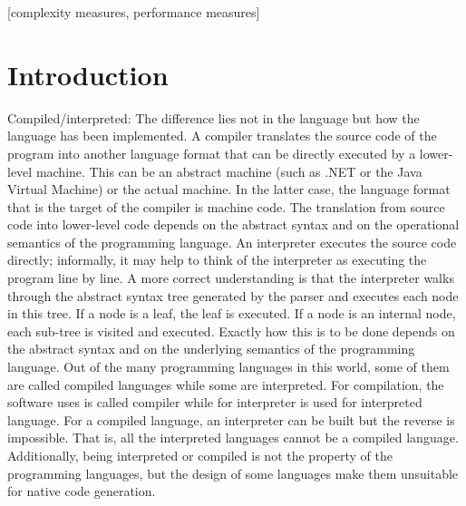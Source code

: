 \documentclass{sig-alternate}
\begin{document}
\maketitle
\begin{abstract}

\end{abstract}

[complexity measures, performance measures]



\section{Introduction}
Compiled/interpreted: The difference lies not in the language but how the language has been implemented. A compiler translates the source code of the program into another language format that can be directly executed by a lower-level machine. This can be an abstract machine (such as .NET or the Java Virtual Machine) or the actual machine. In the latter case, the language format that is the target of the compiler is machine code. The translation from source code into lower-level code depends on the abstract syntax and on the operational semantics of the programming language. An interpreter executes the source code directly; informally, it may help to think of the interpreter as executing the program line by line. A more correct understanding is that the interpreter walks through the abstract syntax tree generated by the parser and executes each node in this tree. If a node is a leaf, the leaf is executed. If a node is an internal node, each sub-tree is visited and executed. Exactly how this is to be done depends on the abstract syntax and on the underlying semantics of the programming language.
Out of the many programming languages in this world, some of them are called compiled languages while some are interpreted. For compilation, the software uses is called compiler while for interpreter is used for interpreted language. For a compiled language, an interpreter can be built but the reverse is impossible. That is, all the interpreted languages cannot be a compiled language. Additionally, being interpreted or compiled is not the property of the programming languages, but the design of some languages make them unsuitable for native code generation.
\end{document}
